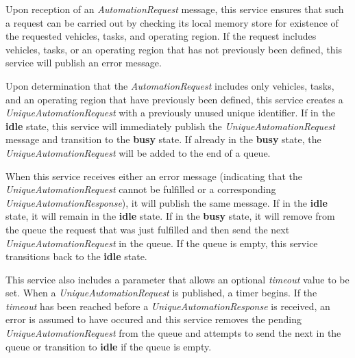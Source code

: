 Upon reception of an \emph{AutomationRequest} message, this service
ensures that such a request can be carried out by checking its local
memory store for existence of the requested vehicles, tasks, and
operating region. If the request includes vehicles, tasks, or an
operating region that has not previously been defined, this service will
publish an error message.

Upon determination that the \emph{AutomationRequest} includes only
vehicles, tasks, and an operating region that have previously been
defined, this service creates a \emph{UniqueAutomationRequest} with a
previously unused unique identifier. If in the \textbf{idle} state, this
service will immediately publish the \emph{UniqueAutomationRequest}
message and transition to the \textbf{busy} state. If already in the
\textbf{busy} state, the \emph{UniqueAutomationRequest} will be added to
the end of a queue.

When this service receives either an error message (indicating that the
\emph{UniqueAutomationRequest} cannot be fulfilled or a corresponding
\emph{UniqueAutomationResponse}), it will publish the same message. If
in the \textbf{idle} state, it will remain in the \textbf{idle} state.
If in the \textbf{busy} state, it will remove from the queue the request
that was just fulfilled and then send the next
\emph{UniqueAutomationRequest} in the queue. If the queue is empty, this
service transitions back to the \textbf{idle} state.

This service also includes a parameter that allows an optional
\emph{timeout} value to be set. When a \emph{UniqueAutomationRequest} is
published, a timer begins. If the \emph{timeout} has been reached before
a \emph{UniqueAutomationResponse} is received, an error is assumed to
have occured and this service removes the pending
\emph{UniqueAutomationRequest} from the queue and attempts to send the
next in the queue or transition to \textbf{idle} if the queue is empty.

